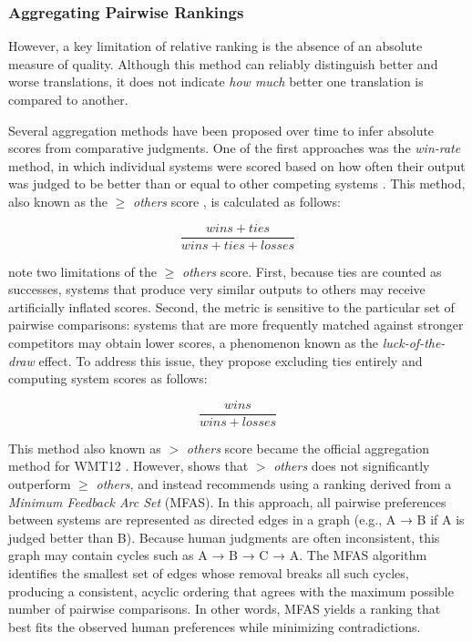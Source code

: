 \subsubsection{Aggregating Pairwise Rankings}
\label{metaevaluation}

However, a key limitation of relative ranking is the absence of an absolute measure of quality. Although this method can reliably distinguish better and worse translations, it does not indicate \textit{how much} better one translation is compared to another. 

Several aggregation methods have been proposed over time to infer absolute scores from comparative judgments. One of the first approaches was the \emph{win-rate} method, in which individual systems were scored based on how often their output was judged to be better than or equal to other competing systems \citep{wmt10}. This method, also known as the $\geq$ \emph{others} score \citep{bojar-grains}, is calculated as follows:

$$\frac{wins+ties}{wins+ties +losses}$$

\cite{bojar-grains} note two limitations of the $\geq$ \emph{others} score. First, because ties are counted as successes, systems that produce very similar outputs to others may receive artificially inflated scores. Second, the metric is sensitive to the particular set of pairwise comparisons: systems that are more frequently matched against stronger competitors may obtain lower scores, a phenomenon known as the \emph{luck-of-the-draw} effect.  To address this issue, they propose excluding ties entirely and computing system scores as follows:

$$\frac{wins}{wins+losses}$$

This method also known as $>$ \emph{others} score  became the official aggregation method for WMT12 \citep{wmt12}. However, \cite{lopez-2012-putting} shows that $>$ \emph{others} does not significantly outperform $ \ge $ \emph{others}, and instead recommends using a ranking derived from a \textit{Minimum Feedback Arc Set} (MFAS). In this approach, all pairwise preferences between systems are represented as directed edges in a graph (e.g., A → B if A is judged better than B). Because human judgments are often inconsistent, this graph may contain cycles such as A → B → C → A. The MFAS algorithm identifies the smallest set of edges whose removal breaks all such cycles, producing a consistent, acyclic ordering that agrees with the maximum possible number of pairwise comparisons. In other words, MFAS yields a ranking that best fits the observed human preferences while minimizing contradictions.

